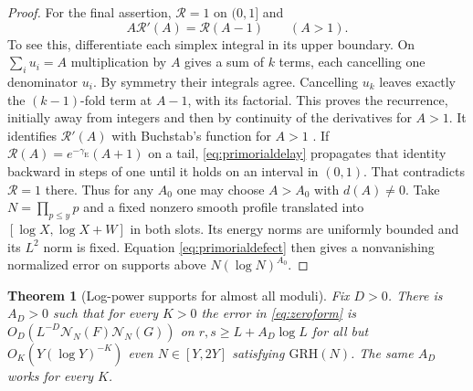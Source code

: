 \documentclass[11pt,a4paper]{article}
\numberwithin{equation}{section}
\newtheorem{theorem}{Theorem}[section]
\newcommand{\grh}{\mathrm{GRH}}
\newcommand{\NN}{\mathcal N_N}
\begin{document}
\begin{proof}
For the final assertion, $\mathcal R=1$ on $(0,1]$ and
\begin{equation}
 A\mathcal R'(A)=\mathcal R(A-1)\qquad (A>1).
 \label{eq:primorialdelay}
\end{equation}
To see this, differentiate each simplex integral
in its upper boundary. On $\sum_i u_i=A$ multiplication
by $A$ gives a sum of $k$ terms, each cancelling one
denominator $u_i$. By symmetry their integrals agree.
Cancelling $u_k$ leaves exactly the $(k-1)$-fold term
at $A-1$, with its factorial. This proves the recurrence,
initially away from integers and then by continuity
of the derivatives for $A>1$. It identifies
$\mathcal R'(A)$ with Buchstab's function for $A>1$
\cite[Section~1]{WeingartnerBuchstab}.
If $\mathcal R(A)=e^{-\gamma_{\mathrm E}}(A+1)$ on a tail,
\cref{eq:primorialdelay} propagates that identity backward
in steps of one until it holds on an interval in $(0,1)$.
That contradicts $\mathcal R=1$ there.
Thus for any $A_0$ one may choose $A>A_0$ with $d(A)\ne0$.
Take $N=\prod_{p\le y}p$ and a fixed nonzero smooth
profile translated into $[\log X,\log X+W]$ in both slots.
Its energy norms are uniformly bounded and its $L^2$ norm
is fixed. Equation \eqref{eq:primorialdefect} then gives
a nonvanishing normalized error on supports above
$N(\log N)^{A_0}$.
\end{proof}

\begin{theorem}[Log-power supports for almost all moduli]
\label{thm:typicalpolylogcovariance}
Fix $D>0$. There is $A_D>0$ such that for every $K>0$
the error in \cref{eq:zeroform} is
$O_D(L^{-D}\NN(F)\NN(G))$ on
$r,s\ge L+A_D\log L$ for all but
$O_K(Y(\log Y)^{-K})$ even $N\in[Y,2Y]$ satisfying
$\grh(N)$. The same $A_D$ works for every $K$.
\end{theorem}
\end{document}
